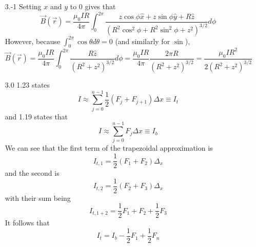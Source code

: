 \documentclass{article}
\begin{document}
    \begin{enumerate}
        \item[3.-1] Setting $x$ and $y$ to 0 gives that
        \begin{equation*}
            \vec{B}(\vec{r}) = \frac{\mu_0 I R}{4\pi} \int_{0}^{2\pi} \frac{z \cos \phi \hat{x} + z\sin \phi \hat{y} + R \hat{z}}{\left(R^2\cos^2\phi + R^2 \sin^2 \phi + z^2\right)^{3/2}} d\phi
        \end{equation*}
        However, because $\int_{0}^{2\pi} \cos \theta d\theta = 0$ (and similarly for $\sin$),
        \begin{equation*}
            \vec{B}(\vec{r}) = \frac{\mu_0 I R}{4\pi} \int_{0}^{2\pi} \frac{R \hat{z}}{\left(R^2 + z^2\right)^{3/2}} d\phi
            = \frac{\mu_0 I R}{4\pi} \frac{2\pi R}{(R^2+z^2)^{3/2}} =
            \frac{\mu_0 I R^2}{2(R^2+z^2)^{3/2}}
        \end{equation*}

        \item[3.0] 1.23 states
        \begin{equation*}
            I \approx \sum_{j=0}^{n-1} \frac{1}{2} (F_j+F_{j+1}) \Delta x \equiv I_t
        \end{equation*}
        and 1.19 states that
        \begin{equation*}
            I \approx \sum_{j=0}^{n-1} F_j \Delta x \equiv I_b
        \end{equation*}
        We can see that the first term of the trapezoidal approximation is
        \begin{equation*}
            I_{t,1} = \frac{1}{2} (F_1 + F_2) \Delta_x
        \end{equation*}
        and the second is
        \begin{equation*}
            I_{t,2} = \frac{1}{2} (F_2 + F_3) \Delta_x
        \end{equation*}
        with their sum being
        \begin{equation*}
            I_{t,1+2} = \frac{1}{2}F_1 + F_2 + \frac{1}{2}F_3
        \end{equation*}
        It follows that
        \begin{equation*}
            I_t = I_b - \frac{1}{2}F_1 + \frac{1}{2}F_n
        \end{equation*}
    \end{enumerate}
\end{document}
